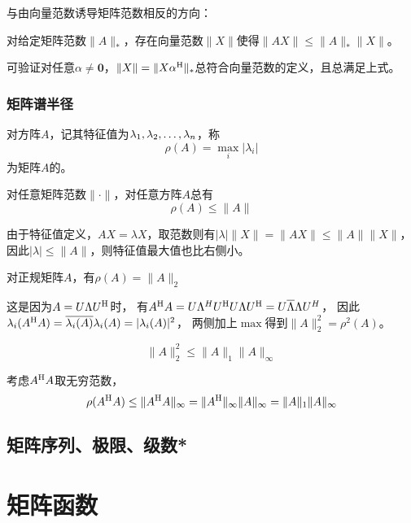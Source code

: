 与由向量范数诱导矩阵范数相反的方向：
\begin{theorem}
    对给定矩阵范数$\|A\|_{*}$，存在向量范数$\|X\|$使得$\|AX\|\leq \|A\|_{*} \|X\|$。
\end{theorem}
可验证对任意$\alpha\neq \bm{0}$，$\|X\|=\|X\alpha^\mathrm{H} \|_{*}$总符合向量范数的定义，且总满足上式。

\subsubsection{矩阵谱半径}

\begin{definition}[谱半径]
    对方阵$A$，记其特征值为$\VectorComma{\lambda}{n}$，称
    \[
        \rho(A) = \max_i |\lambda_i|
    \]
    为矩阵$A$的。
\end{definition}

\begin{theorem}
    对任意矩阵范数$\|\cdot\|$，对任意方阵$A$总有
    \[
        \rho(A) \leq \|A\|
    \]
\end{theorem}
由于特征值定义，$AX=\lambda X$，取范数则有$|\lambda| \|X\| = \|AX\| \leq \|A\|\|X\|$，
因此$|\lambda| \leq \|A\|$，则特征值最大值也比右侧小。

\begin{theorem}
    对正规矩阵$A$，有$\rho(A)=\|A\|_2$
\end{theorem}
这是因为$A=U\Lambda U^\mathrm{H}$时，
有$A\Hermitian A=U\Lambda^H U\Hermitian U \Lambda U\Hermitian \linebreak[1]=U\overline{\Lambda} \Lambda U^H$，
因此$\lambda_i(A^\mathrm{H} A)=\overline{\lambda_i(A)}\lambda_i(A)=|\lambda_i(A)|^2$，
两侧加上$\max$得到$\|A\|_2^2=\rho^2(A)$。

\begin{theorem}
    \[
        \|A\|_2^2 \leq \|A\|_1 \|A\|_\infty
    \]
\end{theorem}
考虑$A^\mathrm{H} A$取无穷范数，
\[
    \rho(A^\mathrm{H} A) \leq \|A^\mathrm{H} A\|_\infty = \|A^\mathrm{H}\|_\infty \|A\|_\infty = \|A\|_1 \|A\|_\infty
\]

\subsection{矩阵序列、极限、级数*}

\section{矩阵函数}

